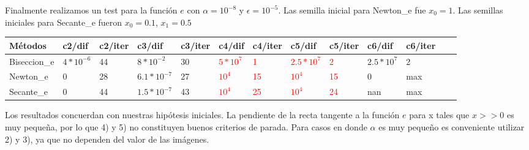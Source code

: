 Finalmente realizamos un test para la función $e$ con $\alpha = 10^{-8}$ y $\epsilon = 10^{-5}$. Las semilla inicial para Newton\_e fue $x_{0}=1$. Las semillas iniciales para Secante\_e fueron $x_{0} = 0.1$, 
$x_{1} = 0.5$

\begin{center}
    \small{
    \begin{tabular}{| l | l | l | l | l | l | l | l | l | l | l | l | l |}
    \hline
    Métodos & c2/dif & c2/iter & c3/dif & c3/iter & c4/dif & c4/iter & c5/dif & c5/iter & c6/dif & c6/iter \\ \hline
    Biseccion\_e & $4*10^{-6}$ & 44 & $8*10^{-2}$ & 30 & \textcolor{red}{$5*10^{7}$} & \textcolor{red}{1} & \textcolor{red}{$2.5*10^{7}$} & \textcolor{red}{2} & {$2.5*10^{7}$} & 2  \\ \hline
    Newton\_e & 0 & 28 & $6.1*10^{-7}$ & 27 & \textcolor{red}{$10^{4}$} & \textcolor{red}{15} & \textcolor{red}{$10^{4}$} & \textcolor{red}{15} & 0 & max \\ \hline
    Secante\_e & 0 & 44 & $1.5*10^{-7}$ & 43 & \textcolor{red}{$10^{4}$} & \textcolor{red}{25} & \textcolor{red}{$10^{4}$} & \textcolor{red}{24} & nan & max   \\ \hline
    \end{tabular}
    }
\end{center}

Los resultados concuerdan con nuestras hipótesis iniciales. La pendiente de la recta tangente a la función $e$ para x tales que $x >> 0$ es muy peque\~na, por lo que 4) y 5) no constituyen buenos
criterios de parada. Para casos en donde $\alpha$ es muy peque\~no es conveniente utilizar 2) y 3), ya que no dependen del valor de las imágenes.




